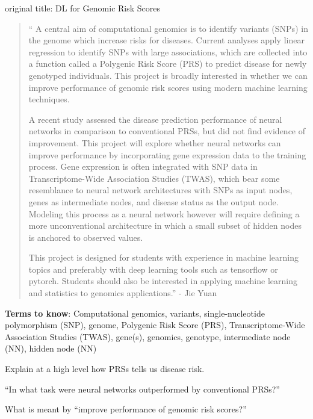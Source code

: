 original title: DL for Genomic Risk Scores
\begin{quotation}
``
A central aim of computational genomics is to identify variants (SNPs) in the genome which increase risks for diseases. Current analyses apply linear regression to identify SNPs with large associations, which are collected into a function called a Polygenic Risk Score (PRS) to predict disease for newly genotyped individuals. This project is broadly interested in whether we can improve performance of genomic risk scores using modern machine learning techniques.

A recent study assessed the disease prediction performance of neural networks in comparison to conventional PRSs, but did not find evidence of improvement. This project will explore whether neural networks can improve performance by incorporating gene expression data to the training process. Gene expression is often integrated with SNP data in Transcriptome-Wide Association Studies (TWAS), which bear some resemblance to neural network architectures with SNPs as input nodes, genes as intermediate nodes, and disease status as the output node. Modeling this process as a neural network however will require defining a more unconventional architecture in which a small subset of hidden nodes is anchored to observed values.

This project is designed for students with experience in machine learning topics and preferably with deep learning tools such as tensorflow or pytorch. Students should also be interested in applying machine learning and statistics to genomics applications.'' - Jie Yuan
\end{quotation}

\textbf{Terms to know}: Computational genomics, variants, single-nucleotide polymorphism (SNP), genome, Polygenic Risk Score (PRS), Transcriptome-Wide Association Studies (TWAS), gene(s), genomics, genotype, intermediate node (NN), hidden node (NN)

\begin{quest}
\item
	Explain at a high level how PRSs tells us disease risk.
\item
	``In what task were neural networks outperformed by conventional PRSs?''
\item
	What is meant by ``improve performance of genomic risk scores?''
\end{quest}

